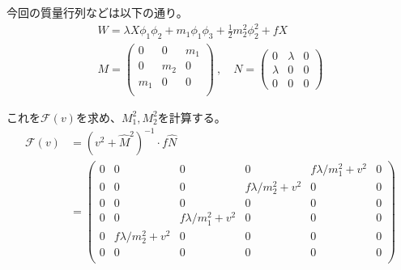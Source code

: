 \documentclass[
  unicode,a4paper,9pt,
  xcolor = {dvipsnames,svgnames},
  hyperref ={colorlinks=true,citecolor=Navy,linkcolor=NavyBlue,urlcolor=purple},
  ja=standard,lualatex
]{beamer}
\begin{document}
\begin{frame}

  今回の質量行列などは以下の通り。
  \begin{gather}
    W=\lambda X\phi_{1}\phi_{2}+m_{1}\phi_{1}\phi_{3}+\frac{1}{2}m_{2}^2\phi_{2}^2+fX
    \label{eqn:eg}
    \nonumber
    \\
    M
    =
    \begin{pmatrix}
      0     & 0     & m_{1} \\
      0     & m_{2} & 0     \\
      m_{1} & 0     & 0     \\
    \end{pmatrix}
    \ ,\quad
    N
    =
    \begin{pmatrix}
      0       & \lambda & 0 \\
      \lambda & 0       & 0 \\
      0       & 0       & 0
    \end{pmatrix}
    \nonumber
  \end{gather}

  これを$\mathcal{F}(v)$を求め、$M_{1}^2, M_{2}^2$を計算する。
  \begin{align}
    \mathcal{F}(v)
     & =
    \left( v^2+\hat{M}^2 \right)^{-1}
    \cdot
    f\hat{N}
    \nonumber
    \\
     & =
    \begin{pmatrix}
      0 & 0                     & 0                     & 0                     & f\lambda /m_{1}^2+v^2 & 0 \\
      0 & 0                     & 0                     & f\lambda /m_{2}^2+v^2 & 0                     & 0 \\
      0 & 0                     & 0                     & 0                     & 0                     & 0 \\
      0 & 0                     & f\lambda /m_{1}^2+v^2 & 0                     & 0                     & 0 \\
      0 & f\lambda /m_{2}^2+v^2 & 0                     & 0                     & 0                     & 0 \\
      0 & 0                     & 0                     & 0                     & 0                     & 0 \\
    \end{pmatrix}
    \nonumber
  \end{align}

\end{frame}
\end{document}
